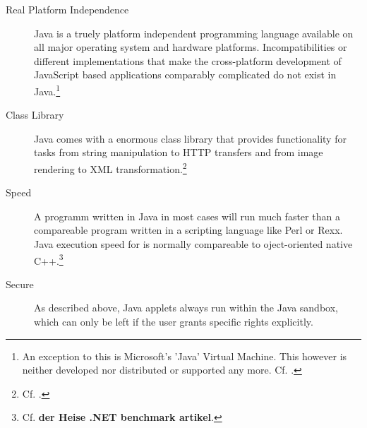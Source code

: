 \begin{description}
	
	\item [Real Platform Independence] Java is a truely platform independent programming language available on all major operating system and hardware platforms. Incompatibilities or different implementations that make the cross-platform development of JavaScript based applications comparably complicated do not exist in Java.\footnote{An exception to this is Microsoft's 'Java' Virtual Machine. This however is neither developed nor distributed or supported any more. Cf. \cite{MSJavaT}.}
	
	\item [Class Library] Java comes with a enormous class library that provides functionality for tasks from string manipulation to HTTP transfers and from image rendering to XML transformation.\footnote{Cf. \cite{JavaAPI}.}
	
	\item [Speed] A programm written in Java in most cases will run much faster than a compareable program written in a scripting language like Perl or Rexx. Java execution speed for is normally compareable to oject-oriented native C++.\footnote{Cf. \textbf{der Heise .NET benchmark artikel}.}
	
	\item [Secure] As described above, Java applets always run within the Java sandbox, which can only be left if the user grants specific rights explicitly.
	
\end{description}